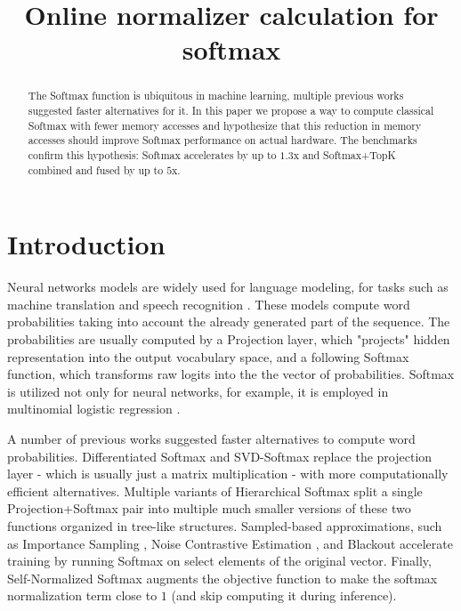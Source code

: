 \title{Online normalizer calculation for softmax}

\begin{abstract}
The Softmax function is ubiquitous in machine learning, multiple previous works suggested faster alternatives for it. In this paper we propose a way to compute classical Softmax with fewer memory accesses and hypothesize that this reduction in memory accesses should improve Softmax performance on actual hardware. The benchmarks confirm this hypothesis: Softmax accelerates by up to $1.3$x and Softmax+TopK combined and fused by up to $5$x.
\end{abstract}

\section{Introduction}

Neural networks models are widely used for language modeling, for tasks such as machine translation \cite{2014arXiv1409.3215S} and speech recognition \cite{6296526}. These models compute word probabilities taking into account the already generated part of the sequence. The probabilities are usually computed by a Projection layer, which "projects" hidden representation into the output vocabulary space, and a following Softmax function, which transforms raw logits into the the vector of probabilities. Softmax is utilized not only for neural networks, for example, it is employed in multinomial logistic regression \cite{PolytomousLR}.

A number of previous works suggested faster alternatives to compute word probabilities. Differentiated Softmax \cite{2015arXiv151204906C} and SVD-Softmax \cite{NIPS2017_7130} replace the projection layer - which is usually just a matrix multiplication - with more computationally efficient alternatives. Multiple variants of Hierarchical Softmax \cite{conf_icassp_Goodman01, 5947611, 2016arXiv160904309G} split a single Projection+Softmax pair into multiple much smaller versions of these two functions organized in tree-like structures. Sampled-based approximations, such as Importance Sampling \cite{Bengio+Senecal-2003}, Noise Contrastive Estimation \cite{2012arXiv1206.6426M}, and Blackout \cite{2015arXiv151106909J} accelerate training by running Softmax on select elements of the original vector. Finally, Self-Normalized Softmax \cite{Devlin14fastand} augments the objective function to make the softmax normalization term close to $1$ (and skip computing it during inference).

